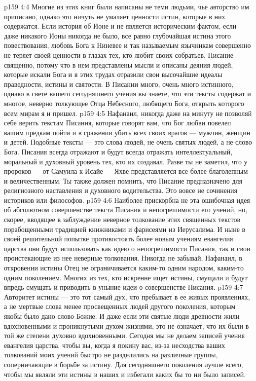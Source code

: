 \vs p159 4:4 Многие из этих книг были написаны не теми людьми, чье авторство им приписано, однако это ничуть не умаляет ценности истин, которые в них содержатся. Если история об Ионе и не является историческим фактом, если даже никакого Ионы никогда не было, все равно глубочайшая истина этого повествования, любовь Бога к Ниневее и так называемым язычникам совершенно не теряет своей ценности в глазах тех, кто любит своих собратьев. Писание священно, потому что в нем представлены мысли и описаны деяния людей, которые искали Бога и в этих трудах отразили свои высочайшие идеалы праведности, истины и святости. В Писании много, очень много истинного, однако в свете вашего сегодняшнего учения вы знаете, что эти тексты содержат и многое, неверно толкующее Отца Небесного, любящего Бога, открыть которого всем мирам я и пришел.
\vs p159 4:5 Нафанаил, никогда даже на минуту не позволяй себе верить текстам Писания, которые говорят вам, что Бог любви повелел вашим предкам пойти и в сражении убить всех своих врагов --- мужчин, женщин и детей. Подобные тексты --- это слова людей, не очень святых людей, а не слово Бога. Писания всегда отражают и будут всегда отражать интеллектуальный, моральный и духовный уровень тех, кто их создавал. Разве ты не заметил, что у пророков --- от Самуила к Исайе --- Яхве представляется все более благолепным и величественным. Ты также должен помнить, что Писание предназначено для религиозного наставления и духовного водительства. Это вовсе не сочинения историков или философов.
\vs p159 4:6 Наиболее прискорбна не эта ошибочная идея об абсолютном совершенстве текста Писания и непогрешимости его учений, но, скорее, вводящее в заблуждение неверное толкование этих священных текстов порабощенными традицией книжниками и фарисеями из Иерусалима. И ныне в своей решительной попытке противостоять более новым учениям евангелия царства они будут использовать как идею о непогрешимости Писания, так и свои проистекающие из нее неверные толкования. Никогда не забывай, Нафанаил, в откровении истины Отец не ограничивается каким\hyp{}то одним народом, каким\hyp{}то одним поколением. Многих из тех, кто искренне ищет истины, смущали и будут впредь смущать и приводить в уныние идеи о совершенстве Писания.
\vs p159 4:7 Авторитет истины --- это тот самый дух, что пребывает в ее живых проявлениях, а не мертвые слова менее просвещенных людей другого поколения, которым якобы было дано слово Божие. И даже если эти святые люди древности жили вдохновенными и проникнутыми духом жизнями, это не означает, что их  были в той же степени духовно вдохновенными. Сегодня мы не делаем записей учения евангелия царства, чтобы вы, когда я покину вас, из\hyp{}за несходства ваших толкований моих учений быстро не разделились на различные группы, соперничающие в борьбе за истину. Для сегодняшнего поколения лучше всего, чтобы мы являли эти истины в наших  и избегали каких бы то ни было записей.
